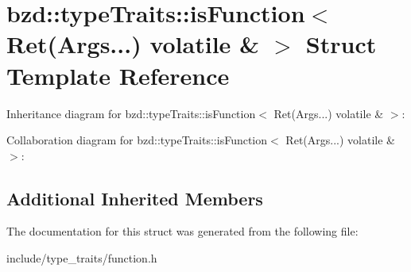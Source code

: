 \hypertarget{structbzd_1_1typeTraits_1_1isFunction_3_01Ret_07Args_8_8_8_08_01volatile_01_6_01_4}{}\section{bzd\+:\+:type\+Traits\+:\+:is\+Function$<$ Ret(Args...) volatile \& $>$ Struct Template Reference}
\label{structbzd_1_1typeTraits_1_1isFunction_3_01Ret_07Args_8_8_8_08_01volatile_01_6_01_4}


Inheritance diagram for bzd\+:\+:type\+Traits\+:\+:is\+Function$<$ Ret(Args...) volatile \& $>$\+:


Collaboration diagram for bzd\+:\+:type\+Traits\+:\+:is\+Function$<$ Ret(Args...) volatile \& $>$\+:
\subsection*{Additional Inherited Members}


The documentation for this struct was generated from the following file\+:\begin{DoxyCompactItemize}
\item 
include/type\+\_\+traits/function.\+h\end{DoxyCompactItemize}

